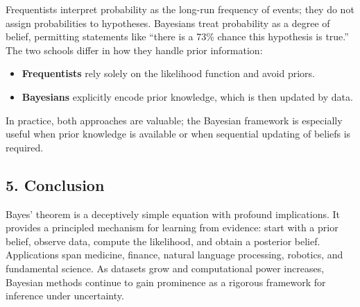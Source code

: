 \documentclass[
]{article}
\providecommand{\tightlist}{%
  \setlength{\itemsep}{0pt}\setlength{\parskip}{0pt}}
\begin{document}
Frequentists interpret probability as the long-run frequency of events;
they do not assign probabilities to hypotheses. Bayesians treat
probability as a degree of belief, permitting statements like ``there is
a 73\% chance this hypothesis is true.'' The two schools differ in how
they handle prior information:

\begin{itemize}
\tightlist
\item
  \textbf{Frequentists} rely solely on the likelihood function and avoid
  priors.
\item
  \textbf{Bayesians} explicitly encode prior knowledge, which is then
  updated by data.
\end{itemize}

In practice, both approaches are valuable; the Bayesian framework is
especially useful when prior knowledge is available or when sequential
updating of beliefs is required.

\hypertarget{conclusion}{%
\subsection{5. Conclusion}\label{conclusion}}

Bayes' theorem is a deceptively simple equation with profound
implications. It provides a principled mechanism for learning from
evidence: start with a prior belief, observe data, compute the
likelihood, and obtain a posterior belief. Applications span medicine,
finance, natural language processing, robotics, and fundamental science.
As datasets grow and computational power increases, Bayesian methods
continue to gain prominence as a rigorous framework for inference under
uncertainty.
\end{document}
